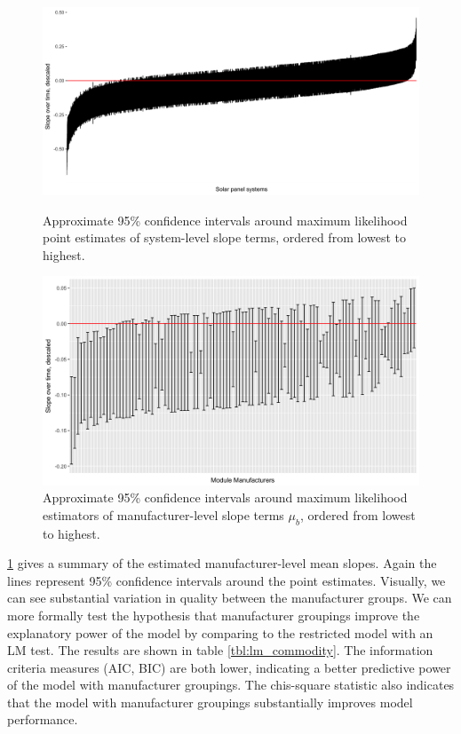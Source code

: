 \documentclass[12pt]{article}
\begin{document}
\begin{figure}
\begin{minipage}{.48\textwidth}
  \includegraphics[width=1\linewidth]{figures/sys_slope_fig.png}
  \caption{Approximate 95\% confidence intervals around maximum likelihood point estimates of system-level slope terms, ordered from lowest to highest.}
  \label{sfig:sys_slope_fig}
\end{minipage}\hfill
\begin{minipage}{.48\textwidth}
  \includegraphics[width=1\linewidth]{figures/nested_manuf_fig_final.png}
  \caption{Approximate 95\% confidence intervals around maximum likelihood estimators of manufacturer-level slope terms $\mu_b$, ordered from lowest to highest.}
  \label{sfig:nested_manuf_fig}
\end{minipage}
\end{figure}

\ref{sfig:nested_manuf_fig} gives a summary of the estimated manufacturer-level mean slopes. Again the lines represent 95\% confidence intervals around the point estimates. Visually, we can see substantial variation in quality between the manufacturer groups. We can more formally test the hypothesis that manufacturer groupings improve the explanatory power of the model by comparing to the restricted model with an LM test. The results are shown in table \ref{tbl:lm_commodity}. The information criteria measures (AIC, BIC) are both lower, indicating a better predictive power of the model with manufacturer groupings. The chis-square statistic also indicates that the model with manufacturer groupings substantially improves model performance.
\end{document}
